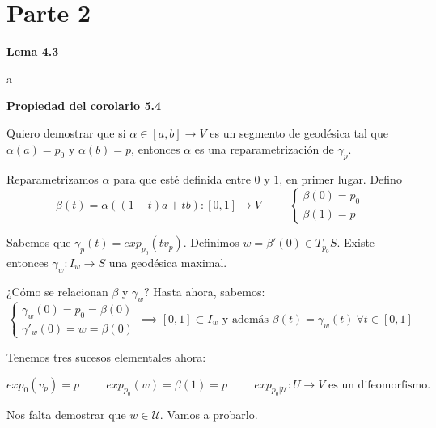 \documentclass[openany]{book}
\begin{document}
\part{Parte 2}

\begin{center}
\textbf{Lema 4.3}
\end{center}
\begin{demonstration}
  a
\end{demonstration}








\begin{center}
\textbf{Propiedad del corolario 5.4}
\end{center}
\begin{demonstration}

  Quiero demostrar que si $ \alpha  \in [a,b] \to  V$ es un segmento de geodésica tal que $\alpha (a) = p_0$ y $\alpha (b) = p$, entonces $\alpha $ es una reparametrización de $\gamma _p$.

  Reparametrizamos $\alpha $ para que esté definida entre $0$ y $1$, en primer lugar. Defino $$\beta (t)=\alpha ((1-t)a+tb):[0,1] \to V \hspace{1cm} \left\{\begin{array}{l}
    \beta (0)=p_0\\
    \beta (1)=p
  \end{array}\right.$$

  Sabemos que $\gamma _p(t) = exp_{p_0}(t v_p)$. Definimos $w= \beta '(0) \in T_{p_0}S$. Existe entonces $\gamma _w : I_w \to S$ una geodésica maximal.

  ¿Cómo se relacionan $ \beta  $ y $ \gamma _w $? Hasta ahora, sabemos:
  $$ \left\{\begin{array}{l}
    \gamma _w(0) = p_0 = \beta (0)\\
    \gamma'_w(0) = w = \beta (0)
  \end{array}\right. \implies [0,1] \subset I_w \text{ y además } \beta (t) = \gamma _w (t)\ \forall t \in [0,1]$$

  Tenemos tres sucesos elementales ahora:

  $$ exp_0(v_p)=p \hspace{1cm} exp_{p_0}(w) = \beta (1) = p \hspace{1cm}exp_{p_0|\mathcal{U}}: U \to V \text{ es un difeomorfismo.} $$

  Nos falta demostrar que $w \in \mathcal{U}$. Vamos a probarlo.


\end{demonstration}
\end{document}
